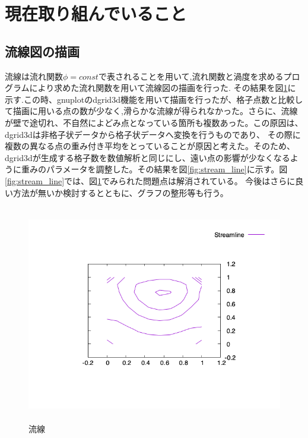 \documentclass[upLaTeX,a4paper]{jsarticle}
\begin{document}
\section{現在取り組んでいること}
\subsection*{流線図の描画}
流線は流れ関数$\phi = const$で表されることを用いて,流れ関数と渦度を求めるプログラムにより求めた流れ関数を用いて流線図の描画を行った.
その結果を図\ref{fig:stream_line_wo_param}に示す.この時、gnuplotのdgrid3d機能を用いて描画を行ったが、格子点数と比較して描画に用いる点の数が少なく,滑らかな流線が得られなかった。さらに、流線が壁で途切れ、不自然によどみ点となっている箇所も複数あった。この原因は、dgrid3dは非格子状データから格子状データへ変換を行うものであり、
その際に複数の異なる点の重み付き平均をとっていること\cite{2}が原因と考えた。そのため、dgrid3dが生成する格子数を数値解析と同じにし、遠い点の影響が少なくなるように重みのパラメータを調整した。その結果を図\ref{fig:stream_line}に示す。図\ref{fig:stream_line}では、図\ref{fig:stream_line_wo_param}でみられた問題点は解消されている。
今後はさらに良い方法が無いか検討するとともに、グラフの整形等も行う。
\begin{figure}[H]
  \centering
  \includegraphics[height=9.5cm]{outputs/img/stream_line_wo_param.png}
  \caption{流線}
  \label{fig:stream_line_wo_param}
\end{figure}
\end{document}
